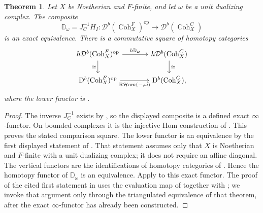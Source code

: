 \documentclass[11pt]{amsart}
\newcommand{\op}{{\operatorname{op}}}
\newcommand{\Coh}{\operatorname{{Coh}}}
\newcommand{\Db}{\mathcal D^b}
\theoremstyle{plain}
\newtheorem{theorem}[theorem]{Theorem}
\theoremstyle{definition}
\numberwithin{equation}{section}
\begin{document}
\begin{theorem}\label{thm:modules}
Let $X$ be Noetherian and $F$-finite, and let $\omega$ be a unit dualizing complex.
The composite
\[
 \mathbb D_\omega=J_C^{-1}H_I:\Db(\Coh^F_X)^{\op}\longrightarrow\Db(\Coh^C_X)
\]
is an exact equivalence.
There is a commutative square of homotopy categories
\[
\begin{tikzcd}[column sep=large]
 h\Db(\Coh^F_X)^{\op}\ar[r,"h\mathbb D_\omega"]\ar[d,"\simeq"']&
 h\Db(\Coh^C_X)\ar[d,"\simeq"]\\
 \mathrm D^b(\Coh^F_X)^{\op}\ar[r,"{\mathrm R\mathcal Hom(-,\omega)}"']&
 \mathrm D^b(\Coh^C_X),
\end{tikzcd}
\]
where the lower functor is \cite[Definition 4.2.5]{Bau}.
\end{theorem}
\begin{proof}
The inverse $J_C^{-1}$ exists by , so the displayed composite is a defined exact $\infty$-functor.
On bounded complexes it is the injective Hom construction of \cite[Definition 4.2.5]{Bau}.
This proves the stated comparison square.
The lower functor is an equivalence by the first displayed statement of \cite[Theorem 4.2.7]{Bau}.
That statement assumes only that $X$ is Noetherian and $F$-finite with a unit dualizing complex; it does not require an affine diagonal.
The vertical functors are the identifications of homotopy categories of .
Hence the homotopy functor of $\mathbb D_\omega$ is an equivalence.
Apply  to this exact functor.
The proof of the cited first statement in \cite[Theorem 4.2.7]{Bau} uses the evaluation map of \cite[Lemma 4.2.6]{Bau} together with \cite[Lemma V.1.2; Corollary V.2.3]{Har}; we invoke that argument only through the triangulated equivalence of that theorem, after the exact $\infty$-functor has already been constructed.
\end{proof}
\end{document}
